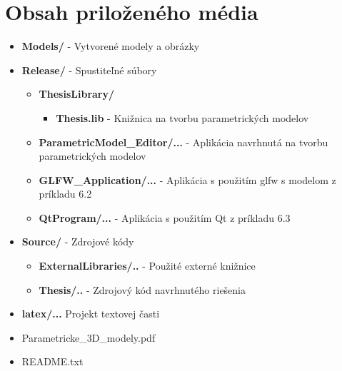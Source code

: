  \renewcommand\labelitemii{$\square$}
 \renewcommand\labelitemiii{$\circ$}
\chapter{Obsah priloženého média}
\begin{itemize}
\item \textbf{Models/} - Vytvorené modely a obrázky
\item \textbf{Release/} - Spustiteľné súbory
\begin{itemize}
    \item \textbf{ThesisLibrary/}
    \begin{itemize}
        \item \textbf{Thesis.lib} - Knižnica na tvorbu parametrických modelov
    \end{itemize}
    \item \textbf{ParametricModel\_Editor/...} - Aplikácia navrhnutá na tvorbu parametrických modelov
    \item \textbf{GLFW\_Application/...} - Aplikácia s použitím glfw s modelom z príkladu 6.2
    \item \textbf{QtProgram/...} - Aplikácia s použitím Qt z príkladu 6.3
\end{itemize}  
\item \textbf{Source/} - Zdrojové kódy
\begin{itemize}
    \item \textbf{ExternalLibraries/..} - Použité externé knižnice
    \item \textbf{Thesis/..} - Zdrojový kód navrhnutého riešenia
\end{itemize}
\item \textbf{latex/...} Projekt textovej časti
\item Parametricke\_3D\_modely.pdf
\item README.txt
\end{itemize}

